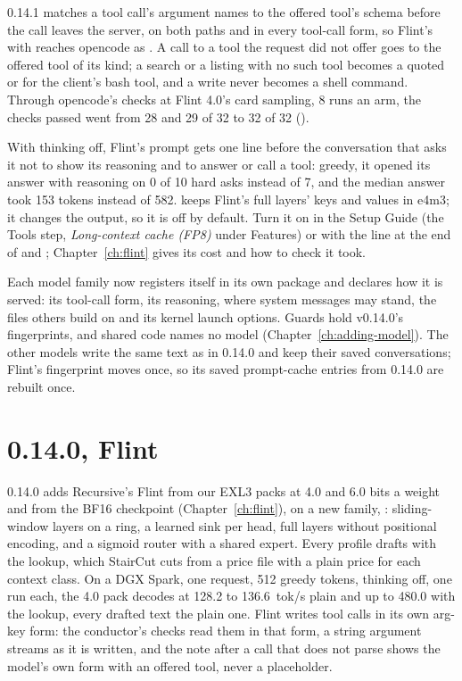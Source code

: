 0.14.1 matches a tool call's argument names to the offered tool's schema before the call leaves the server, on both paths and in every tool-call form, so Flint's  with  reaches opencode as . A call to a tool the request did not offer goes to the offered tool of its kind; a search or a listing with no such tool becomes a quoted  or  for the client's bash tool, and a write never becomes a shell command. Through opencode's checks at Flint 4.0's card sampling, 8 runs an arm, the checks passed went from 28 and 29 of 32 to 32 of 32 (\measured).

With thinking off, Flint's prompt gets one line before the conversation that asks it not to show its reasoning and to answer or call a tool: greedy, it opened its answer with reasoning on 0 of 10 hard asks instead of 7, and the median answer took 153 tokens instead of 582.  keeps Flint's full layers' keys and values in e4m3; it changes the output, so it is off by default. Turn it on in the Setup Guide (the Tools step, \emph{Long-context cache (FP8)} under Features) or with the line  at the end of  and ; Chapter~\ref{ch:flint} gives its cost and how to check it took.

Each model family now registers itself in its own package and declares how it is served: its tool-call form, its reasoning, where system messages may stand, the files others build on and its kernel launch options. Guards hold v0.14.0's fingerprints, and shared code names no model (Chapter~\ref{ch:adding-model}). The other models write the same text as in 0.14.0 and keep their saved conversations; Flint's fingerprint moves once, so its saved prompt-cache entries from 0.14.0 are rebuilt once.

\section{0.14.0, Flint}\label{sec:changelog-0140}

0.14.0 adds Recursive's Flint from our EXL3 packs at 4.0 and 6.0 bits a weight and from the BF16 checkpoint (Chapter~\ref{ch:flint}), on a new family, : sliding-window layers on a ring, a learned sink per head, full layers without positional encoding, and a sigmoid router with a shared expert. Every profile drafts with the lookup, which StairCut cuts from a price file with a plain price for each context class. On a DGX Spark, one request, 512 greedy tokens, thinking off, one run each, the 4.0 pack decodes at 128.2 to 136.6~tok/s plain and up to 480.0 with the lookup, every drafted text the plain one. Flint writes tool calls in its own arg-key form: the conductor's checks read them in that form, a string argument streams as it is written, and the note after a call that does not parse shows the model's own form with an offered tool, never a placeholder.

